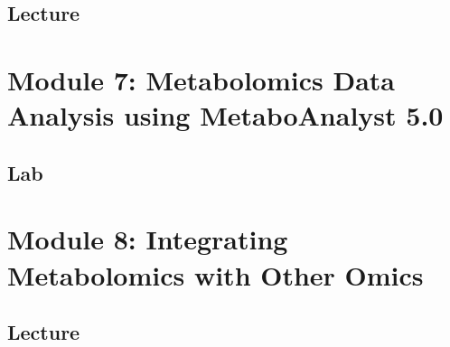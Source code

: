 \documentclass[
]{book}
\begin{document}
\section{Lecture}\label{lecture-4}

\chapter{Module 7: Metabolomics Data Analysis using MetaboAnalyst 5.0}\label{module-7-metabolomics-data-analysis-using-metaboanalyst-5.0}

\section{Lab}\label{lab-1}

\chapter{Module 8: Integrating Metabolomics with Other Omics}\label{module-8-integrating-metabolomics-with-other-omics}

\section{Lecture}\label{lecture-5}

  
\end{document}

